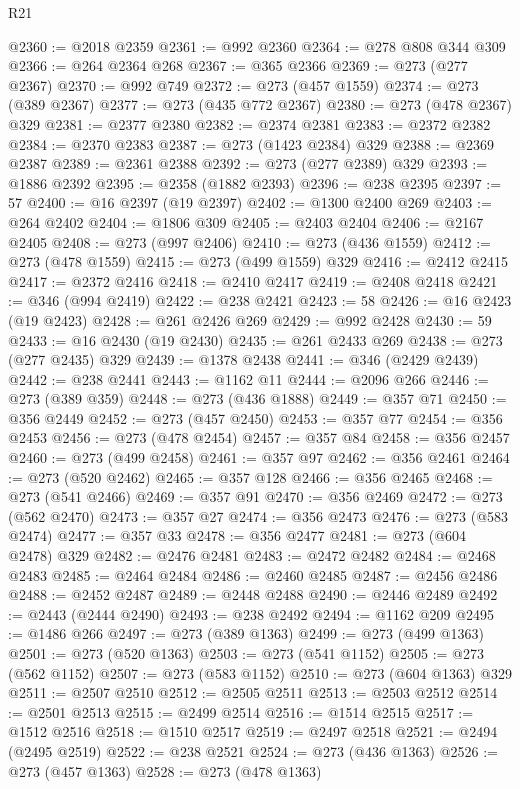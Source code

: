 \begin{lexlean}{R21}
\begin{coremodule}
{{{{{{{{{{{{{{{{{{{@2360 := @2018 @2359
@2361 := @992 @2360
@2364 := @278 @808 @344 @309
@2366 := @264 @2364 @268
@2367 := @365 @2366
@2369 := @273 (@277 @2367)
@2370 := @992 @749
@2372 := @273 (@457 @1559)
@2374 := @273 (@389 @2367)
@2377 := @273 (@435 @772 @2367)
@2380 := @273 (@478 @2367) @329
@2381 := @2377 @2380
@2382 := @2374 @2381
@2383 := @2372 @2382
@2384 := @2370 @2383
@2387 := @273 (@1423 @2384) @329
@2388 := @2369 @2387
@2389 := @2361 @2388
@2392 := @273 (@277 @2389) @329
@2393 := @1886 @2392
@2395 := @2358 (@1882 @2393)
@2396 := @238 @2395
@2397 := 57
@2400 := @16 @2397 (@19 @2397)
@2402 := @1300 @2400 @269
@2403 := @264 @2402
@2404 := @1806 @309
@2405 := @2403 @2404
@2406 := @2167 @2405
@2408 := @273 (@997 @2406)
@2410 := @273 (@436 @1559)
@2412 := @273 (@478 @1559)
@2415 := @273 (@499 @1559) @329
@2416 := @2412 @2415
@2417 := @2372 @2416
@2418 := @2410 @2417
@2419 := @2408 @2418
@2421 := @346 (@994 @2419)
@2422 := @238 @2421
@2423 := 58
@2426 := @16 @2423 (@19 @2423)
@2428 := @261 @2426 @269
@2429 := @992 @2428
@2430 := 59
@2433 := @16 @2430 (@19 @2430)
@2435 := @261 @2433 @269
@2438 := @273 (@277 @2435) @329
@2439 := @1378 @2438
@2441 := @346 (@2429 @2439)
@2442 := @238 @2441
@2443 := @1162 @11
@2444 := @2096 @266
@2446 := @273 (@389 @359)
@2448 := @273 (@436 @1888)
@2449 := @357 @71
@2450 := @356 @2449
@2452 := @273 (@457 @2450)
@2453 := @357 @77
@2454 := @356 @2453
@2456 := @273 (@478 @2454)
@2457 := @357 @84
@2458 := @356 @2457
@2460 := @273 (@499 @2458)
@2461 := @357 @97
@2462 := @356 @2461
@2464 := @273 (@520 @2462)
@2465 := @357 @128
@2466 := @356 @2465
@2468 := @273 (@541 @2466)
@2469 := @357 @91
@2470 := @356 @2469
@2472 := @273 (@562 @2470)
@2473 := @357 @27
@2474 := @356 @2473
@2476 := @273 (@583 @2474)
@2477 := @357 @33
@2478 := @356 @2477
@2481 := @273 (@604 @2478) @329
@2482 := @2476 @2481
@2483 := @2472 @2482
@2484 := @2468 @2483
@2485 := @2464 @2484
@2486 := @2460 @2485
@2487 := @2456 @2486
@2488 := @2452 @2487
@2489 := @2448 @2488
@2490 := @2446 @2489
@2492 := @2443 (@2444 @2490)
@2493 := @238 @2492
@2494 := @1162 @209
@2495 := @1486 @266
@2497 := @273 (@389 @1363)
@2499 := @273 (@499 @1363)
@2501 := @273 (@520 @1363)
@2503 := @273 (@541 @1152)
@2505 := @273 (@562 @1152)
@2507 := @273 (@583 @1152)
@2510 := @273 (@604 @1363) @329
@2511 := @2507 @2510
@2512 := @2505 @2511
@2513 := @2503 @2512
@2514 := @2501 @2513
@2515 := @2499 @2514
@2516 := @1514 @2515
@2517 := @1512 @2516
@2518 := @1510 @2517
@2519 := @2497 @2518
@2521 := @2494 (@2495 @2519)
@2522 := @238 @2521
@2524 := @273 (@436 @1363)
@2526 := @273 (@457 @1363)
@2528 := @273 (@478 @1363)
}}}}}}}}}}}}}}}}}}}
\end{coremodule}
\end{lexlean}
